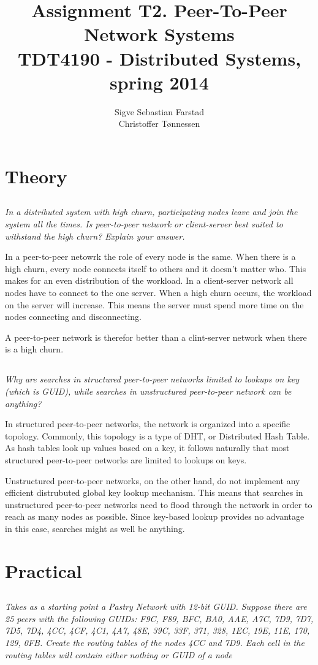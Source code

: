 \documentclass{article}
\title{Assignment T2. Peer-To-Peer Network Systems \\
\large TDT4190 - Distributed Systems, spring 2014}
\author{
    Sigve Sebastian Farstad \\
    Christoffer Tønnessen
}
\newcommand{\question}[1]{\subsection{}\textit{#1}\bigskip}
\begin{document}
\maketitle

\section{Theory}

\question{In a distributed system with high churn, participating nodes leave and join the system all the times. Is peer-to-peer network or client-server best suited to withstand the high churn? Explain your answer.}

In a peer-to-peer netowrk the role of every node is the same.
When there is a high churn, every node connects itself to others and it doesn't matter who.
This makes for an even distribution of the workload.
In a client-server network all nodes have to connect to the one server.
When a high churn occurs, the workload on the server will increase.
This means the server must spend more time on the nodes connecting and disconnecting.

A peer-to-peer network is therefor better than a clint-server network when there is a high churn.

\question{Why are searches in structured peer-to-peer networks limited to lookups on key (which is GUID), while searches in unstructured peer-to-peer network can be anything?}

In structured peer-to-peer networks, the network is organized into a specific topology.
Commonly, this topology is a type of DHT, or Distributed Hash Table.
As hash tables look up values based on a key, it follows naturally that most structured peer-to-peer networks are limited to lookups on keys.

Unstructured peer-to-peer networks, on the other hand, do not implement any efficient distrubuted global key lookup mechanism.
This means that searches in unstructured peer-to-peer networks need to flood through the network in order to reach as many nodes as possible.
Since key-based lookup provides no advantage in this case, searches might as well be anything.

 \section{Practical}

 \question{Takes as a starting point a Pastry Network with 12-bit GUID. Suppose there are 25 peers with the following GUIDs: F9C, F89, BFC, BA0, AAE, A7C, 7D9, 7D7, 7D5, 7D4, 4CC, 4CF, 4C1, 4A7, 48E, 39C, 33F, 371, 328, 1EC, 19E, 11E, 170, 129, 0FB. Create the routing tables of the nodes 4CC and 7D9. Each cell in the routing tables will contain either nothing or GUID of a node}
\end{document}
